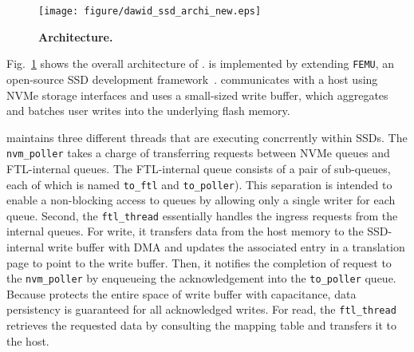 \begin{figure}[t!]
    \centering{}
    \texttt{[image: figure/dawid\_ssd\_archi\_new.eps]}
    \caption{\textbf{\ours{} Architecture.}}
    \label{fig_dawid_archi}
    \vspace{-20pt}
\end{figure}

Fig.~\ref{fig_dawid_archi} shows the overall
architecture of \ours{}. %
\ours{} is implemented by extending \texttt{FEMU}, an open-source SSD development
framework~\cite{li2018case}. 
\ours{} communicates with a host using NVMe storage interfaces and uses a small-sized write buffer, which aggregates and batches user writes into the underlying flash memory.  


\ours{} maintains three different threads that are executing concrrently
within SSDs.  The \texttt{nvm\_poller} takes a charge of transferring requests
between NVMe queues and FTL-internal queues. The FTL-internal queue consists of
a pair of sub-queues, each of which is named \texttt{to\_ftl} and
\texttt{to\_poller}). This separation is intended to enable a non-blocking
access to queues by allowing only a single writer for each queue.  Second, the
\texttt{ftl\_thread} essentially handles the ingress requests from the internal
queues. For write, it transfers data from the host memory to the SSD-internal
write buffer with DMA and updates the associated entry in a translation page to
point to the write buffer. Then, it notifies the completion of request to the
\texttt{nvm\_poller} by enqueueing the acknowledgement into the
\texttt{to\_poller} queue.  Because \ours{} protects the entire space of write
buffer with capacitance, data persistency is guaranteed for all acknowledged
writes.  For read, the \texttt{ftl\_thread} retrieves the requested data by
consulting the mapping table and transfers it to the host. 

